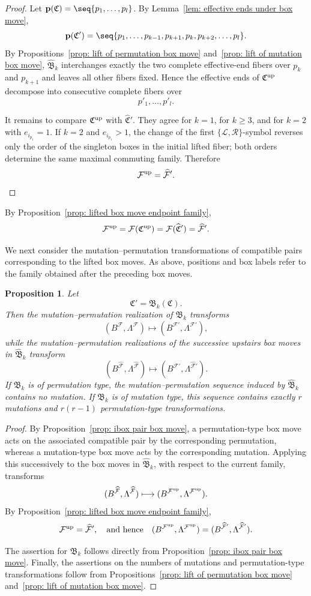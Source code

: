 \documentclass[12pt, leqno]{amsart}
\numberwithin{equation}{section}
\theoremstyle{plain}
\newtheorem{proposition}[lemma]{Proposition}
\theoremstyle{definition}
\renewcommand{\ge}{\geqslant}
\newcommand{\up}{{\rm up}}
\newcommand{\frakB}{\mathfrak{B}}
\newcommand{\frakC}{\mathfrak{C}}
\newcommand{\hfrakC}{\widehat{\frakC}}
\newcommand{\bfp}{\mathbf{p}}
\newcommand{\calF}{\mathcal{F}}
\newcommand{\calL}{\mathcal{L}}
\newcommand{\calR}{\mathcal{R}}
\newcommand{\hcalF}{{\widehat{\calF}}}
\newcommand{\hfrakB}{\widehat{\frakB}}
\newcommand{\qtqh}[1][{and hence}]{\quad\text{{#1}}\quad}
\begin{document}
\begin{proof}
Let $\bfp(\frakC)=\seq{p_1,\ldots,p_l}$.
By Lemma~\ref{lem: effective ends under box move},
\[
\bfp(\frakC')
=
\seq{p_1,\ldots,p_{k-1},p_{k+1},p_k,p_{k+2},\ldots,p_l}.
\]
By Propositions~\ref{prop: lift of permutation box move}
 and~\ref{prop: lift of mutation box move}, $\hfrakB_k$
interchanges{} exactly the two complete effective-end fibers over
$p_k$ and $p_{k+1}$ and leaves all other fibers fixed. Hence the
effective ends of $\frakC^\up$ decompose into consecutive complete
fibers over
\[
p'_1,\ldots,p'_l.
\]

It remains to compare $\frakC^\up$ with $\hfrakC'$. They agree for
$k=1$, for $k\ge3$, and for $k=2$  with $e_{i_{p_1}}=1$. If
$k=2$ and $e_{i_{p_1}}>1$, the change of the first
$\{\calL,\calR\}$-symbol  reverses only the order of the singleton boxes in the initial lifted fiber;
both orders determine the same maximal commuting family.{}
Therefore
\[
\calF^\up=\hcalF'. \qedhere
\]
\end{proof}

By Proposition~\ref{prop: lifted box move endpoint family},
\[
\calF^\up = \calF(\frakC^\up) = \calF(\hfrakC') = \hcalF'.
\]

We next consider the mutation--permutation transformations of
compatible pairs corresponding to the lifted box moves. As above,
positions and box labels refer to the family obtained after the
preceding box moves.

\begin{proposition}\label{prop: box move mutation permutation realization}
Let
\[
\frakC'=\frakB_k(\frakC).
\]
Then the mutation--permutation realization of $\frakB_k$ transforms
\[
(B^\calF,\Lambda^\calF) \longmapsto (B^{\calF'},\Lambda^{\calF'}),
\]
while the mutation--permutation realizations of the successive
upstairs box moves in $\hfrakB_k$ transform
\[
(B^\hcalF,\Lambda^\hcalF) \longmapsto (B^{\hcalF'},\Lambda^{\hcalF'}).
\]
 If $\frakB_k$ is of permutation type, the mutation--permutation
sequence induced by $\hfrakB_k$ contains no mutation.
If $\frakB_k$ is of mutation type, this sequence contains{}
exactly $r$ mutations and $r(r-1)$ permutation-type transformations.
\end{proposition}

\begin{proof}
By Proposition~\ref{prop: ibox pair box move}, a permutation-type
box move acts on the associated compatible pair by the corresponding
permutation, whereas a mutation-type box move acts by the
corresponding mutation. Applying this successively to the box moves
in $\hfrakB_k$, with respect to the current family,
transforms
\[
(B^\hcalF,\Lambda^\hcalF) \longmapsto (B^{\calF^\up},\Lambda^{\calF^\up}).
\]
By Proposition~\ref{prop: lifted box move endpoint family},
\[
\calF^\up=\hcalF', \qtqh  (B^{\calF^\up},\Lambda^{\calF^\up}) = (B^{\hcalF'},\Lambda^{\hcalF'}).
\]

 The assertion for $\frakB_k$  follows directly from
Proposition~\ref{prop: ibox pair box move}. Finally, the assertions
on the numbers of mutations and permutation-type transformations
follow from Propositions~\ref{prop: lift of permutation box move}
and~\ref{prop: lift of mutation box move}.
\end{proof}
\end{document}

